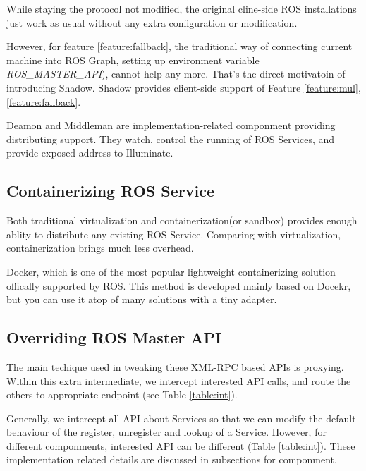 While staying the protocol not modified, the original cline-side ROS installations just work as
usual without any extra configuration or modification.

However, for feature \ref{feature:fallback}, the traditional way of connecting current machine into ROS Graph,
setting up environment variable \emph{ROS\_MASTER\_API}), cannot help any more.
That's the direct motivatoin of introducing Shadow.
Shadow provides client-side support of Feature \ref{feature:mul}, \ref{feature:fallback}. 

Deamon and Middleman are implementation-related componment providing distributing support.
They watch, control the running of ROS Services, and provide exposed address to Illuminate.

\subsection{Containerizing ROS Service}
Both traditional virtualization and containerization(or sandbox) provides enough ablity to distribute any existing ROS Service.
Comparing with virtualization, containerization brings much less overhead. %

Docker, which is one of the most popular lightweight containerizing solution offically supported by ROS.
This method is developed mainly based on Docekr, but you can use it atop of many solutions with a tiny adapter. 


\subsection{Overriding ROS Master API}
The main techique used in tweaking these XML-RPC based APIs is proxying.
Within this extra intermediate, we intercept interested API calls,
and route the others to appropriate endpoint (see Table \ref{table:int}).

Generally, we intercept all API about Services so that we can modify the default behaviour of the register,
unregister and lookup of a Service.
However, for different componments, interested API can be different (Table \ref{table:int}).
These implementation related details are discussed in subsections for componment.
 
